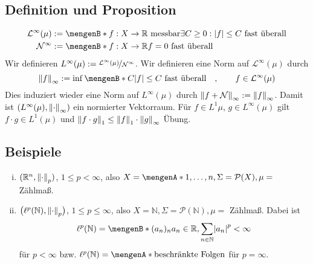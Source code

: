 \subsection[Definition und Proposition: Der normierte Raum $L^\infty(\mu)$ und ]{Definition und Proposition} %
\label{sub:48}
\begin{align*}
	\mathcal{L}^\infty(\mu) &:= \set[f : X \to \mathds{R} \text{ messbar}]{\exists C \ge 0 : \abs*{f} \le C \text{ fast überall} \rule{0cm}{0.7em} }  \\
	\mathcal{N}^\infty &:= \set[f : X \to \mathds{R}]{f=0 \text{ fast überall}} 
\end{align*}
Wir definieren $L^\infty(\mu) := \nicefrac{\mathcal{L}^\infty(\mu)}{\mathcal{N}^\infty}$. Wir definieren eine Norm auf $\mathcal{L}^\infty(\mu)$ durch
\[
	\norm[\infty]{f} := \inf \set[C]{\abs*{f} \le C \text{ fast überall} }\quad , \qquad f \in \mathcal{L}^\infty(\mu)  
\]
Dies induziert wieder eine Norm auf $L^\infty(\mu)$ durch $\norm[\infty]{f + \mathcal{N}} := \norm[\infty]{f}$. Damit ist $\enbrace*{L^\infty(\mu), \norm[\infty]{\cdot}}$
ein normierter Vektorraum. Für $f \in L^1{\mu}$, $g \in L^\infty(\mu)$ gilt $f \cdot g \in L^1(\mu)$ und $\norm[1]{f \cdot g} \le \norm[1]{f} \cdot \norm[\infty]{g}$
Übung. \bewende

\subsection[Beispiele für $L^p$-Räume]{Beispiele} %
\label{sub:49}
\begin{enumerate}[(i)]
	\item $(\mathds{R}^n, \norm[p]{\cdot})$, $1 \le p < \infty$, also $X=\set{1,\ldots,n}, \Sigma=\mathcal{P}(X), \mu =$ Zählmaß.
	\item $\enbrace[\big]{\ell^p(\mathds{N}), \norm[p]{\cdot }}$, $1 \le p \le \infty$, also $X=\mathds{N}, \Sigma=\mathcal{P}(\mathds{N}), \mu=$ Zählmaß.
	Dabei ist 
	\[
		\ell^p(\mathds{N}) = \set[(a_n)_n]{a_n \in \mathds{R}, \sum_{n \in \mathds{N}} \abs*{a_n}^p < \infty} 
	\]
	für $p < \infty$ bzw. $\ell^p(\mathds{N})= \set{\text{beschränkte Folgen}}$ für $p=\infty$.
\end{enumerate}

